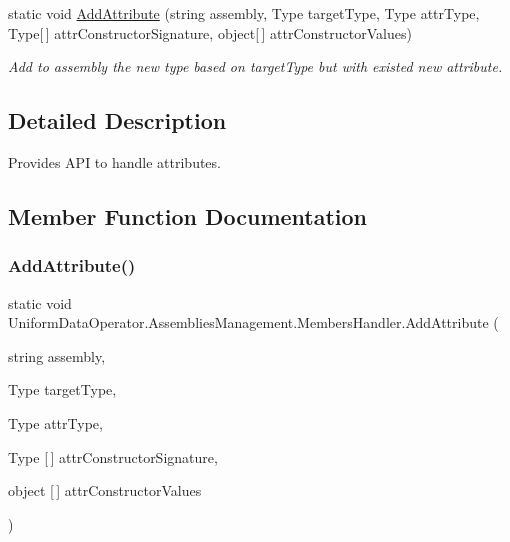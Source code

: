 \begin{DoxyCompactItemize}
static void \mbox{\hyperlink{class_uniform_data_operator_1_1_assemblies_management_1_1_members_handler_ae0fefd738ce818c44bc8dbb602be3bf1}{Add\+Attribute}} (string assembly, Type target\+Type, Type attr\+Type, Type\mbox{[}$\,$\mbox{]} attr\+Constructor\+Signature, object\mbox{[}$\,$\mbox{]} attr\+Constructor\+Values)
\begin{DoxyCompactList}\small\item\em Add to assembly the new type based on target\+Type but with existed new attribute. \end{DoxyCompactList}\end{DoxyCompactItemize}


\subsection{Detailed Description}
Provides A\+PI to handle attributes. 



\subsection{Member Function Documentation}
\mbox{\label{class_uniform_data_operator_1_1_assemblies_management_1_1_members_handler_ae0fefd738ce818c44bc8dbb602be3bf1}} 
\subsubsection{\texorpdfstring{Add\+Attribute()}{AddAttribute()}}
{\footnotesize\ttfamily static void Uniform\+Data\+Operator.\+Assemblies\+Management.\+Members\+Handler.\+Add\+Attribute (\begin{DoxyParamCaption}\item[{string}]{assembly,  }\item[{Type}]{target\+Type,  }\item[{Type}]{attr\+Type,  }\item[{Type \mbox{[}$\,$\mbox{]}}]{attr\+Constructor\+Signature,  }\item[{object \mbox{[}$\,$\mbox{]}}]{attr\+Constructor\+Values }\end{DoxyParamCaption})\hspace{0.3cm}{\ttfamily [static]}}



